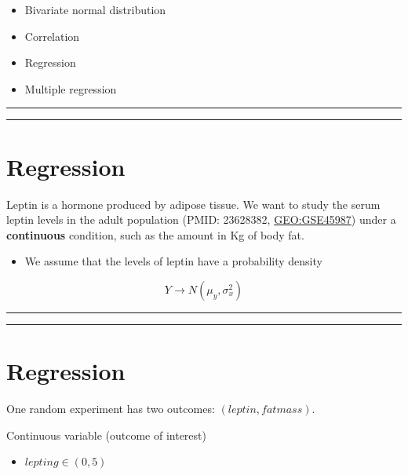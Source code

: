 \documentclass[
]{book}
\providecommand{\tightlist}{%
  \setlength{\itemsep}{0pt}\setlength{\parskip}{0pt}}
\begin{document}
\begin{itemize}
\tightlist
\item
  Bivariate normal distribution
\item
  Correlation
\item
  Regression
\item
  Multiple regression
\end{itemize}

\begin{center}\rule{0.5\linewidth}{0.5pt}\end{center}

\begin{center}\rule{0.5\linewidth}{0.5pt}\end{center}

\hypertarget{regression}{%
\section{Regression}\label{regression}}

Leptin is a hormone produced by adipose tissue. We want to study the serum leptin levels in the adult population (PMID: 23628382, \url{GEO:GSE45987}) under a \textbf{continuous} condition, such as the amount in Kg of body fat.

\begin{itemize}
\tightlist
\item
  We assume that the levels of leptin have a probability density
\end{itemize}

\[Y \rightarrow N(\mu_y, \sigma_x^2)\]

\begin{center}\rule{0.5\linewidth}{0.5pt}\end{center}

\begin{center}\rule{0.5\linewidth}{0.5pt}\end{center}

\hypertarget{regression-1}{%
\section{Regression}\label{regression-1}}

One random experiment has two outcomes: \((leptin, fatmass)\).

Continuous variable (outcome of interest)

\begin{itemize}
\tightlist
\item
  \(lepting \in (0, 5)\)
\end{itemize}
\end{document}
